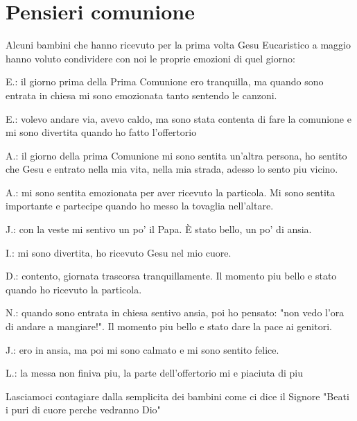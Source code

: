 \section{Pensieri comunione}

Alcuni bambini che hanno ricevuto per la prima volta Gesu Eucaristico a maggio
hanno voluto condividere con noi le proprie emozioni di quel giorno:

E.: il giorno prima della Prima Comunione ero tranquilla, ma quando sono
entrata in chiesa mi sono emozionata tanto sentendo le canzoni.

E.: volevo andare via, avevo caldo, ma sono stata contenta di fare la
comunione e mi sono divertita quando ho fatto l'offertorio

A.: il giorno della prima Comunione mi sono sentita un'altra persona, ho
sentito che Gesu e entrato nella mia vita, nella mia strada, adesso lo sento
piu vicino.

A.: mi sono sentita emozionata per aver ricevuto la particola. Mi sono sentita
importante e partecipe quando ho messo la tovaglia nell'altare.

J.: con la veste mi sentivo un po' il Papa. È stato bello, un po' di ansia.

I.: mi sono divertita, ho ricevuto Gesu nel mio cuore.

D.: contento, giornata trascorsa tranquillamente. Il momento piu bello e stato
quando ho ricevuto la particola.

N.: quando sono entrata in chiesa sentivo ansia, poi ho pensato: "non vedo
l'ora di andare a mangiare!". Il momento piu bello e stato dare la pace ai
genitori.

J.: ero in ansia, ma poi mi sono calmato e mi sono sentito felice.

L.: la messa non finiva piu, la parte dell'offertorio mi e piaciuta di piu

Lasciamoci contagiare dalla semplicita dei bambini come ci dice il Signore
"Beati i puri di cuore perche vedranno Dio"



